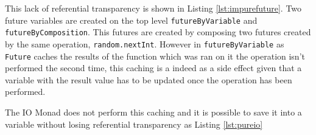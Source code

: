 \documentclass[../main.tex]{subfiles}
\begin{document}


This lack of referential transparency is shown in Listing \ref{lst:impurefuture}. Two
future variables are created on the top level \texttt{futureByVariable} and
\texttt{futureByComposition}. This futures are created by composing two futures
created by the same operation, \texttt{random.nextInt}. However in
\texttt{futureByVariable} as \texttt{Future} caches the results of the function
which was ran on it the operation isn't performed the second time, this caching
is a indeed as a side effect given that a variable with the result value has to
be updated once the operation has been performed.

The IO Monad does not perform this caching and it is possible to save it into a
variable without losing referential transparency as Listing \ref{lst:pureio}


\end{document}
